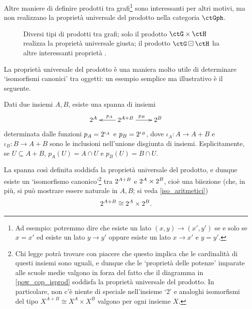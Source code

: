 Altre maniere di definire prodotti tra grafi\footnote{Ad esempio: potremmo dire che esiste un lato \((x,y) \to (x',y')\) se e solo se \(x=x'\) ed esiste un lato \(y\to y'\) oppure esiste un lato \(x\to x'\) e \(y=y'\).} sono interessanti per altri motivi, ma non realizzano la proprietà universale del prodotto nella categoria \(\ctGph\).
\begin{figure}
 \caption{Diversi tipi di prodotti tra grafi; solo il prodotto \(\ctG\times\ctH\) realizza la proprietà universale giusta; il prodotto \(\ctG\boxdot\ctH\) ha altre interessanti proprietà \cite{foo}.}
\end{figure}
La proprietà universale del prodotto è una maniera molto utile di determinare `isomorfismi canonici' tra oggetti: un esempio semplice ma illustrativo è il seguente.
\begin{lemma}\label{inrel_cop_isprod}
 Dati due insiemi \(A,B\), esiste una spanna di insiemi
 \begin{equation}
  \label{pow_cop_isprod}\xymatrix{
   \pow A & \ar[r]^{p_B}\ar[l]_{p_A}\pow{A+B} & \pow B
  }
 \end{equation}
 determinata dalle funzioni \(p_A= 2^{\iota_A}\) e \(p_B=2^{\iota_B}\), dove \(\iota_A \colon A \to A+B\) e \(\iota_B \colon B \to A+B\) sono le inclusioni nell'unione disgiunta di insiemi. Esplicitamente, se \(U\subseteq A+B\),  \(p_A(U)= A \cap U\) e \(p_B(U)= B \cap U\).

 La spanna così definita soddisfa la proprietà universale del prodotto, e dunque esiste un `isomorfismo canonico'\footnote{Chi legge potrà trovare con piacere che questo implica che le cardinalità di questi insiemi sono uguali, e dunque che le `proprietà delle potenze' imparate alle scuole medie valgono in forza del fatto che il diagramma in \eqref{pow_cop_isprod} soddisfa la proprietà universale del prodotto. In particolare, non c'è niente di speciale nell'insieme `2' e analoghi isomorfismi del tipo \(X^{A+B}\cong X^A\times X^B\) valgono per ogni insieme \(X\).} tra \(2^{A+B}\) e \(2^{A} \times 2^{B}\), cioè una biiezione (che, in più, si può mostrare essere naturale in \(A,B\); si veda \ref{iso_aritmetici})
 \[2^{A+B} \cong 2^{A} \times 2^{B}.\]
\end{lemma}
